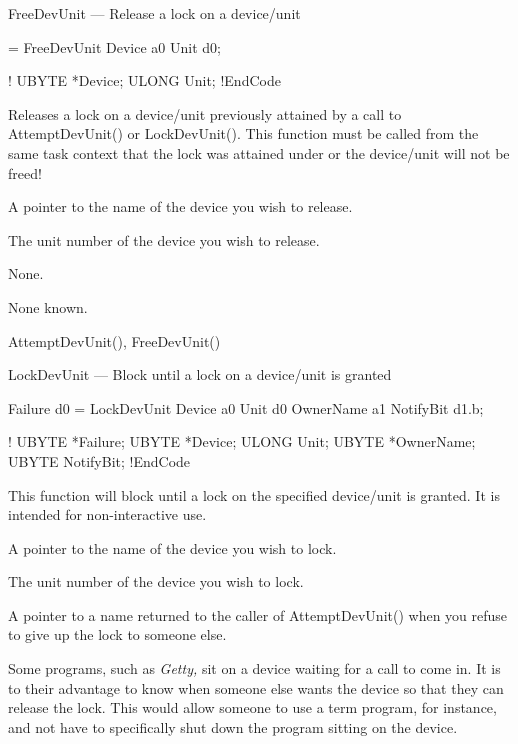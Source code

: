 FreeDevUnit --- Release a lock on a device/unit

\Synopsis = FreeDevUnit Device a0 Unit d0;

\BeginCode!
UBYTE   *Device;
ULONG    Unit;
!EndCode

Releases a lock on a device/unit previously attained by a call to {\TT
AttemptDevUnit()} or {\TT LockDevUnit()}.  This function must be called
from the same task context that the lock was attained under or the
device/unit will not be freed!

A pointer to the name of the device you wish to release.
\EndSub

The unit number of the device you wish to release.

None.

None known.

{\TT AttemptDevUnit()},
{\TT FreeDevUnit()}


LockDevUnit --- Block until a lock on a device/unit is granted

\Synopsis Failure d0 = LockDevUnit Device a0 Unit d0 OwnerName a1
NotifyBit d1.b;

\BeginCode!
UBYTE   *Failure;
UBYTE   *Device;
ULONG    Unit;
UBYTE   *OwnerName;
UBYTE    NotifyBit;
!EndCode

This function will block until a lock on the specified device/unit is
granted.  It is intended for non-interactive use.

A pointer to the name of the device you wish to lock.
\EndSub

The unit number of the device you wish to lock.
\EndSub

A pointer to a name returned to the caller of {\TT AttemptDevUnit()} when
you refuse to give up the lock to someone else.
\EndSub

Some programs, such as {\sl Getty,} sit on a device waiting for a call to
come in.  It is to their advantage to know when someone else wants the device
so that they can release the lock.  This would allow someone to use a term
program, for instance, and not have to specifically shut down the program
sitting on the device.

